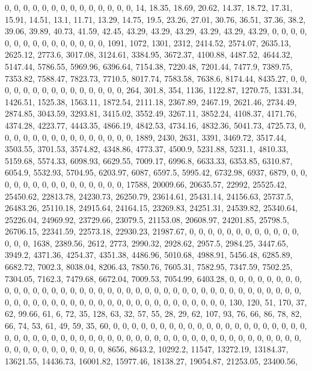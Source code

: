 \documentclass[
]{article}
\begin{document}
0, 0, 0, 0, 0, 0, 0, 0, 0, 0, 0, 0, 0, 0, 14, 18.35, 18.69, 20.62,
14.37, 18.72, 17.31, 15.91, 14.51, 13.1, 11.71, 13.29, 14.75, 19.5,
23.26, 27.01, 30.76, 36.51, 37.36, 38.2, 39.06, 39.89, 40.73, 41.59,
42.45, 43.29, 43.29, 43.29, 43.29, 43.29, 43.29, 0, 0, 0, 0, 0, 0, 0, 0,
0, 0, 0, 0, 0, 0, 0, 1091, 1072, 1301, 2312, 2414.52, 2574.07, 2635.13,
2625.12, 2773.6, 3017.08, 3124.61, 3384.95, 3672.37, 4100.88, 4487.52,
4644.32, 5147.44, 5786.55, 5969.96, 6396.64, 7154.38, 7220.48, 7201.44,
7477.9, 7389.75, 7353.82, 7588.47, 7823.73, 7710.5, 8017.74, 7583.58,
7638.6, 8174.44, 8435.27, 0, 0, 0, 0, 0, 0, 0, 0, 0, 0, 0, 0, 0, 0, 0,
264, 301.8, 354, 1136, 1122.87, 1270.75, 1331.34, 1426.51, 1525.38,
1563.11, 1872.54, 2111.18, 2367.89, 2467.19, 2621.46, 2734.49, 2874.85,
3043.59, 3293.81, 3415.02, 3552.49, 3267.11, 3852.24, 4108.37, 4171.76,
4374.28, 4223.77, 4443.35, 4866.19, 4842.53, 4734.16, 4832.36, 5041.73,
4725.73, 0, 0, 0, 0, 0, 0, 0, 0, 0, 0, 0, 0, 0, 0, 0, 1889, 2430, 2631,
3391, 3469.72, 3517.44, 3503.55, 3701.53, 3574.82, 4348.86, 4773.37,
4500.9, 5231.88, 5231.1, 4810.33, 5159.68, 5574.33, 6098.93, 6629.55,
7009.17, 6996.8, 6633.33, 6353.85, 6310.87, 6054.9, 5532.93, 5704.95,
6203.97, 6087, 6597.5, 5995.42, 6732.98, 6937, 6879, 0, 0, 0, 0, 0, 0,
0, 0, 0, 0, 0, 0, 0, 0, 0, 17588, 20009.66, 20635.57, 22992, 25525.42,
25450.62, 22813.78, 24230.73, 26250.79, 23614.61, 25431.14, 24156.63,
25737.5, 26483.26, 25110.18, 24915.64, 24164.15, 23269.83, 24251.31,
24539.82, 25340.64, 25226.04, 24969.92, 23729.66, 23079.5, 21153.08,
20608.97, 24201.85, 25798.5, 26706.15, 22341.59, 22573.18, 22930.23,
21987.67, 0, 0, 0, 0, 0, 0, 0, 0, 0, 0, 0, 0, 0, 0, 0, 1638, 2389.56,
2612, 2773, 2990.32, 2928.62, 2957.5, 2984.25, 3447.65, 3949.2, 4371.36,
4254.37, 4351.38, 4486.96, 5010.68, 4988.91, 5456.48, 6285.89, 6682.72,
7002.3, 8038.04, 8206.43, 7850.76, 7605.31, 7582.95, 7347.59, 7502.25,
7304.05, 7162.3, 7479.68, 6672.04, 7009.53, 7054.99, 6403.28, 0, 0, 0,
0, 0, 0, 0, 0, 0, 0, 0, 0, 0, 0, 0, 0, 0, 0, 0, 0, 0, 0, 0, 0, 0, 0, 0,
0, 0, 0, 0, 0, 0, 0, 0, 0, 0, 0, 0, 0, 0, 0, 0, 0, 0, 0, 0, 0, 0, 0, 0,
0, 0, 0, 0, 0, 0, 0, 0, 0, 0, 0, 0, 0, 130, 120, 51, 170, 37, 62, 99.66,
61, 6, 72, 35, 128, 63, 32, 57, 55, 28, 29, 62, 107, 93, 76, 66, 86, 78,
82, 66, 74, 53, 61, 49, 59, 35, 60, 0, 0, 0, 0, 0, 0, 0, 0, 0, 0, 0, 0,
0, 0, 0, 0, 0, 0, 0, 0, 0, 0, 0, 0, 0, 0, 0, 0, 0, 0, 0, 0, 0, 0, 0, 0,
0, 0, 0, 0, 0, 0, 0, 0, 0, 0, 0, 0, 0, 0, 0, 0, 0, 0, 0, 0, 0, 0, 0, 0,
0, 0, 0, 0, 8656, 8643.2, 10292.2, 11547, 13272.19, 13184.37, 13621.55,
14436.73, 16001.82, 15977.46, 18138.27, 19054.87, 21253.05, 23400.56,
\end{document}
